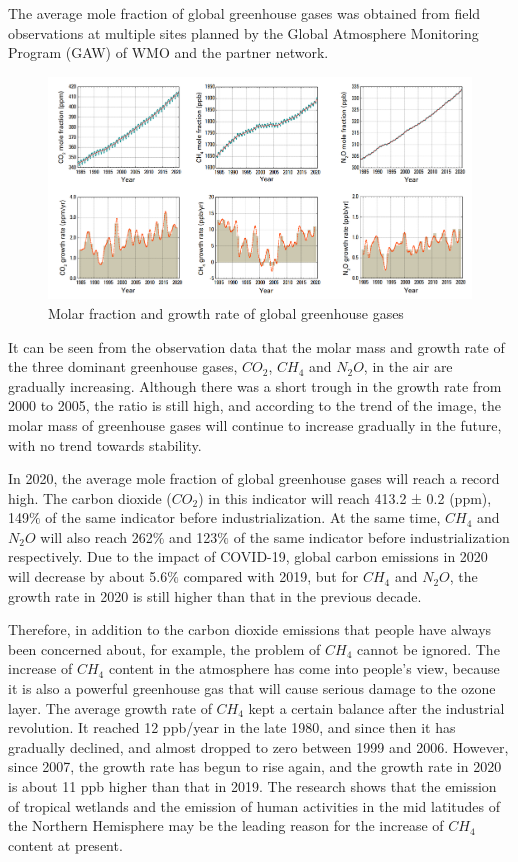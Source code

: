 \documentclass{apmcmthesis}
\begin{document}
The average mole fraction of global greenhouse gases was obtained from field observations at multiple sites planned by the Global Atmosphere Monitoring Program (GAW) of WMO and the partner network.\cite{101}

 \begin{figure} 
    \centering
    \includegraphics[width=14cm]{APMCMThesis/figures/tu1.png}
    \caption{Molar fraction and growth rate of global greenhouse gases}
\label{growth}
\end{figure}

It can be seen from the observation data that the molar mass and growth rate of the three dominant greenhouse gases, $CO_2$, $CH_4$ and $N_2O$, in the air are gradually increasing. Although there was a short trough in the growth rate from 2000 to 2005, the ratio is still high, and according to the trend of the image, the molar mass of greenhouse gases will continue to increase gradually in the future, with no trend towards stability.

In 2020, the average mole fraction of global greenhouse gases will reach a record high. The carbon dioxide ($CO_2$) in this indicator will reach 413.2 ± 0.2 (ppm), 149$\%$ of the same indicator before industrialization. At the same time, $CH_4$ and $N_2O$ will also reach 262$\%$ and 123$\%$ of the same indicator before industrialization respectively. Due to the impact of COVID-19, global carbon emissions in 2020 will decrease by about 5.6$\%$ compared with 2019\cite{102}, but for $CH_4$ and $N_2O$, the growth rate in 2020 is still higher than that in the previous decade.

Therefore, in addition to the carbon dioxide emissions that people have always been concerned about, for example, the problem of $CH_4$ cannot be ignored. The increase of $CH_4$ content in the atmosphere has come into people's view, because it is also a powerful greenhouse gas that will cause serious damage to the ozone layer. The average growth rate of $CH_4$ kept a certain balance after the industrial revolution. It reached 12 ppb/year in the late 1980, and since then it has gradually declined, and almost dropped to zero between 1999 and 2006. However, since 2007, the growth rate has begun to rise again, and the growth rate in 2020 is about 11 ppb higher than that in 2019. The research shows that the emission of tropical wetlands and the emission of human activities in the mid latitudes of the Northern Hemisphere may be the leading reason for the increase of $CH_4$ content at present\cite{103}.
\end{document}
